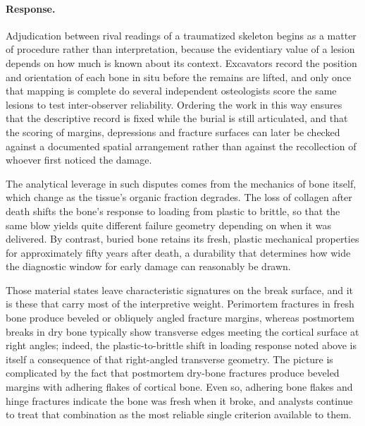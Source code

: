 \documentclass[11pt]{article}
\begin{document}
\paragraph{Response.} {\small Adjudication between rival readings of a traumatized skeleton begins as a matter of procedure rather than interpretation, because the evidentiary value of a lesion depends on how much is known about its context. Excavators record the position and orientation of each bone in situ before the remains are lifted, and only once that mapping is complete do several independent osteologists score the same lesions to test inter-observer reliability. Ordering the work in this way ensures that the descriptive record is fixed while the burial is still articulated, and that the scoring of margins, depressions and fracture surfaces can later be checked against a documented spatial arrangement rather than against the recollection of whoever first noticed the damage.

The analytical leverage in such disputes comes from the mechanics of bone itself, which change as the tissue's organic fraction degrades. The loss of collagen after death shifts the bone's response to loading from plastic to brittle, so that the same blow yields quite different failure geometry depending on when it was delivered. By contrast, buried bone retains its fresh, plastic mechanical properties for approximately fifty years after death, a durability that determines how wide the diagnostic window for early damage can reasonably be drawn.

Those material states leave characteristic signatures on the break surface, and it is these that carry most of the interpretive weight. Perimortem fractures in fresh bone produce beveled or obliquely angled fracture margins, whereas postmortem breaks in dry bone typically show transverse edges meeting the cortical surface at right angles; indeed, the plastic-to-brittle shift in loading response noted above is itself a consequence of that right-angled transverse geometry. The picture is complicated by the fact that postmortem dry-bone fractures produce beveled margins with adhering flakes of cortical bone. Even so, adhering bone flakes and hinge fractures indicate the bone was fresh when it broke, and analysts continue to treat that combination as the most reliable single criterion available to them.

}
\end{document}
